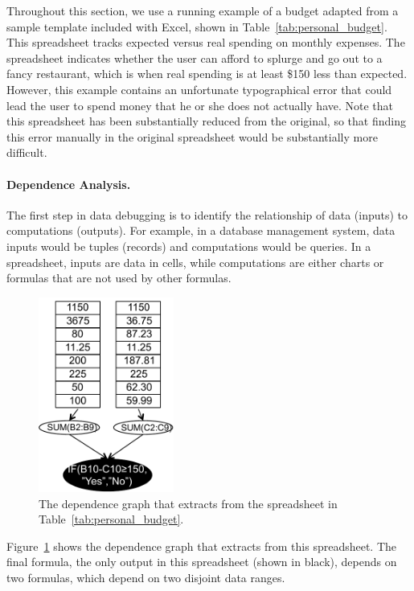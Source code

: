 
Throughout this section, we use a running example of a budget adapted
from a sample template included with Excel, shown in
Table~\ref{tab:personal_budget}. This spreadsheet tracks expected
versus real spending on monthly expenses. The spreadsheet indicates
whether the user can afford to splurge and go out to a fancy
restaurant, which is when real spending is at least \$150 less than
expected. However, this example contains an unfortunate typographical
error that could lead the user to spend money that he or she does not
actually have. Note that this spreadsheet has been substantially
reduced from the original, so that finding this error manually in the
original spreadsheet would be substantially more difficult.

\paragraph{Dependence Analysis.}
The first step in data debugging is to identify the relationship of
data (inputs) to computations (outputs). For example, in a database
management system, data inputs would be tuples (records) and computations would
be queries. In a spreadsheet, inputs are data in cells, while
computations are either charts or formulas that are not used by other formulas.

\begin{figure}[!t]
\centering
\includegraphics[width=1.75in]{dependence-graph}
\caption{The dependence graph that \checkcell{} extracts from the spreadsheet in Table~\ref{tab:personal_budget}.\label{fig:dependence-graph}}
\end{figure}
 
Figure~\ref{fig:dependence-graph} shows the dependence graph that \checkcell{}
extracts from this spreadsheet. The final formula, the only output in
this spreadsheet (shown in black), depends on two formulas, which depend on two
disjoint data ranges.

